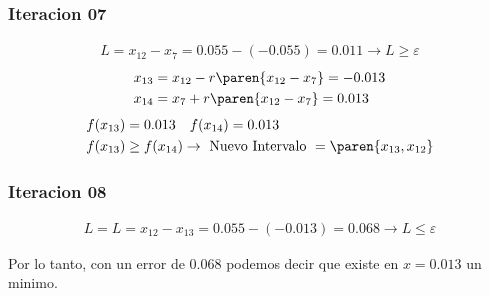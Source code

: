 \begin{homeworkProblem}
\subsubsection{Iteracion 07}
\begin{align*}
    L=x_{12}-x_7=0.055-(-0.055)=0.011 \rightarrow L \geq \varepsilon
\end{align*}
\begin{align*}
    &x_{13}=x_{12} - r\paren{x_{12}-x_7}= -0.013\\
    &x_{14}=x_7 + r\paren{x_{12}-x_7}= 0.013
\end{align*}
\begin{align*}
    &f(x_{13})=0.013 \quad f(x_{14})=0.013\\
    &f(x_{13}) \geq f(x_{14}) \rightarrow \text{ Nuevo Intervalo } = \paren{x_{13},x_{12}}
\end{align*}

\subsubsection{Iteracion 08}
\begin{align*}
    L=L=x_{12}-x_{13}=0.055-(-0.013)=0.068\rightarrow L \leq \varepsilon
\end{align*}

Por lo tanto, con un error de $0.068$ podemos decir que existe en $x=0.013$ un minimo.

\end{homeworkProblem}